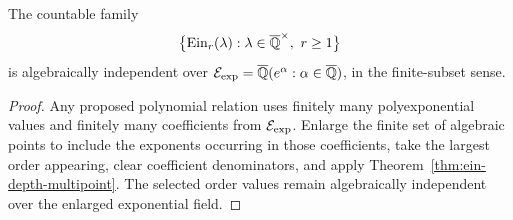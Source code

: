 \begin{corollary}
\label{cor:ein-depth-pure-exponential}
The countable family
\[
 \bigl\{\operatorname{Ein}_{r}(\lambda):
      \lambda\in\overline{\mathbb Q}^\times,\ r\geq1\bigr\}
\]
is algebraically independent over
\(\mathcal E_{\mathrm{exp}}=\overline{\mathbb Q}(e^\alpha:\alpha\in\overline{\mathbb Q})\), in the finite-subset sense.
\end{corollary}

\begin{proof}
Any proposed polynomial relation uses finitely many polyexponential values and
finitely many coefficients from \(\mathcal E_{\mathrm{exp}}\).  Enlarge the finite set of
algebraic points to include the exponents occurring in those coefficients,
take the largest order appearing, clear coefficient denominators, and
apply Theorem~\ref{thm:ein-depth-multipoint}.  The selected order values
remain algebraically independent over the enlarged exponential field.
\end{proof}

